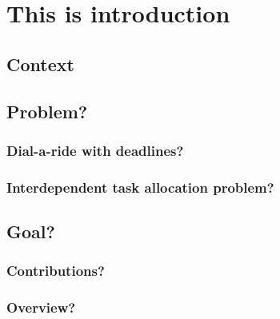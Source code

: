 \chapter{This is introduction}\label{ch:introduction}



\section{Context}

\section{Problem?}
\subsection{Dial-a-ride with deadlines?}
\subsection{Interdependent task allocation problem?}
\section{Goal?}
\subsection{Contributions?}
\subsection{Overview?}




\cleardoublepage

